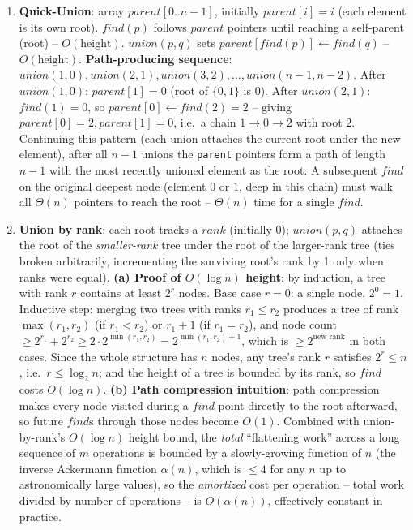 \documentclass[11pt]{article}
\begin{document}
\begin{enumerate}[label=\textbf{A\arabic*.}, leftmargin=2.2em]
\item \textbf{Quick-Union}: array $parent[0..n-1]$, initially $parent[i]=i$ (each element
is its own root). $find(p)$ follows $parent$ pointers until reaching a self-parent (root)
-- $O(\text{height})$. $union(p,q)$ sets $parent[find(p)] \gets find(q)$ -- $O(\text{height})$.
\textbf{Path-producing sequence}: $union(1,0), union(2,1), union(3,2), \dots,
union(n-1,n-2)$. After $union(1,0)$: $parent[1]=0$ (root of $\{0,1\}$ is $0$). After
$union(2,1)$: $find(1)=0$, so $parent[0] \gets find(2) = 2$ -- giving $parent[0]=2,
parent[1]=0$, i.e.\ a chain $1 \to 0 \to 2$ with root $2$. Continuing this pattern (each
union attaches the current root under the new element), after all $n-1$ unions the
\texttt{parent} pointers form a path of length $n-1$ with the most recently unioned
element as the root. A subsequent $find$ on the original deepest node (element $0$ or
$1$, deep in this chain) must walk all $\Theta(n)$ pointers to reach the root --
$\Theta(n)$ time for a single $find$.

\item \textbf{Union by rank}: each root tracks a $rank$ (initially 0); $union(p,q)$
attaches the root of the \emph{smaller-rank} tree under the root of the larger-rank tree
(ties broken arbitrarily, incrementing the surviving root's rank by 1 only when ranks were
equal). \textbf{(a) Proof of $O(\log n)$ height}: by induction, a tree with rank $r$
contains at least $2^r$ nodes. Base case $r=0$: a single node, $2^0=1$. Inductive step:
merging two trees with ranks $r_1 \le r_2$ produces a tree of rank $\max(r_1,r_2)$ (if
$r_1<r_2$) or $r_1+1$ (if $r_1=r_2$), and node count $\ge 2^{r_1}+2^{r_2} \ge 2\cdot
2^{\min(r_1,r_2)} = 2^{\min(r_1,r_2)+1}$, which is $\ge 2^{\text{new rank}}$ in both
cases. Since the whole structure has $n$ nodes, any tree's rank $r$ satisfies $2^r \le n$,
i.e.\ $r \le \log_2 n$; and the height of a tree is bounded by its rank, so $find$ costs
$O(\log n)$. \textbf{(b) Path compression intuition}: path compression makes every node
visited during a $find$ point directly to the root afterward, so future $find$s through
those nodes become $O(1)$. Combined with union-by-rank's $O(\log n)$ height bound, the
\emph{total} ``flattening work'' across a long sequence of $m$ operations is bounded by a
slowly-growing function of $n$ (the inverse Ackermann function $\alpha(n)$, which is
$\le 4$ for any $n$ up to astronomically large values), so the \emph{amortized} cost per
operation -- total work divided by number of operations -- is $O(\alpha(n))$, effectively
constant in practice.

\end{enumerate}
\end{document}
